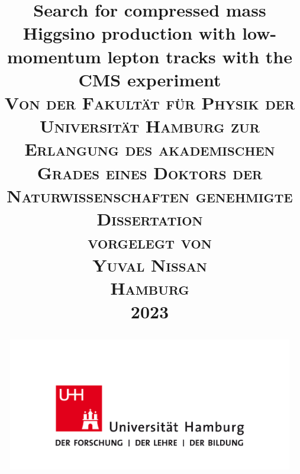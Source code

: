 \documentclass[12pt,a4paper]{book}
\begin{document}
\frontmatter

\thispagestyle{empty}

\title{
        \LARGE \textbf{Search for compressed mass Higgsino production with low-momentum
lepton tracks with the CMS experiment} \\[1.2cm]
        {\large\textsc{
		Von der Fakult\"at für Physik
		der Universit\"at Hamburg zur Erlangung des akademischen Grades eines
		Doktors der Naturwissenschaften genehmigte Dissertation
		\\[1.2cm]
		vorgelegt von
		\\[1.2cm]
		Yuval Nissan\\
		Hamburg\\
		2023
        }}
\vfill
\begin{center}
        \includegraphics[width=125mm]{uhh-logo.png}
\end{center}        
        
}
\author{}
\date{}
\maketitle


\thispagestyle{empty}


\thispagestyle{empty}
\null\vfill


\pagebreak

\tableofcontents

\mainmatter








%

\printglossaries

 
\listoffigures
\listoftables

\backmatter
\newpage{}
\end{document}
